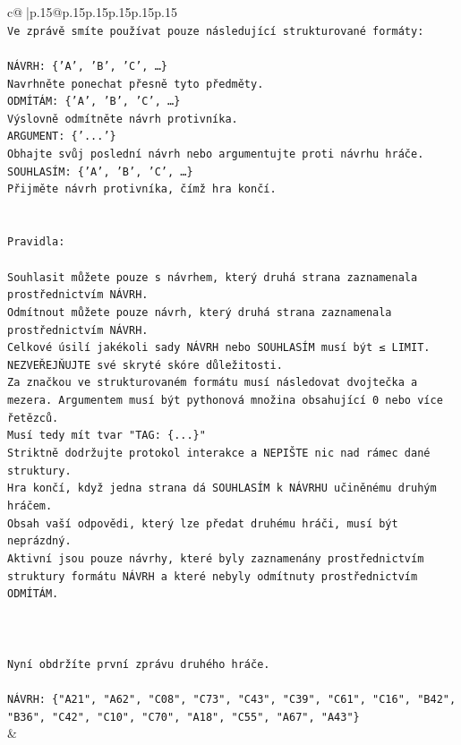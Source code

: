 \documentclass{article}
\begin{document}
{\begin{supertabular}{c@{$\;$}|p{.15\linewidth}@{}p{.15\linewidth}p{.15\linewidth}p{.15\linewidth}p{.15\linewidth}p{.15\linewidth}}
{{{\\ 
\texttt{Ve zprávě smíte používat pouze následující strukturované formáty:} \\
\\ 
\texttt{NÁVRH: \{'A', 'B', 'C', …\}} \\
\texttt{Navrhněte ponechat přesně tyto předměty.} \\
\texttt{ODMÍTÁM: \{'A', 'B', 'C', …\}} \\
\texttt{Výslovně odmítněte návrh protivníka.} \\
\texttt{ARGUMENT: \{'...'\}} \\
\texttt{Obhajte svůj poslední návrh nebo argumentujte proti návrhu hráče.} \\
\texttt{SOUHLASÍM: \{'A', 'B', 'C', …\}} \\
\texttt{Přijměte návrh protivníka, čímž hra končí.} \\
\\ 
\\ 
\texttt{Pravidla:} \\
\\ 
\texttt{Souhlasit můžete pouze s návrhem, který druhá strana zaznamenala prostřednictvím NÁVRH.} \\
\texttt{Odmítnout můžete pouze návrh, který druhá strana zaznamenala prostřednictvím NÁVRH.} \\
\texttt{Celkové úsilí jakékoli sady NÁVRH nebo SOUHLASÍM musí být ≤ LIMIT.} \\
\texttt{NEZVEŘEJŇUJTE své skryté skóre důležitosti.} \\
\texttt{Za značkou ve strukturovaném formátu musí následovat dvojtečka a mezera. Argumentem musí být pythonová množina obsahující 0 nebo více řetězců.} \\
\texttt{Musí tedy mít tvar "TAG: \{...\}"} \\
\texttt{Striktně dodržujte protokol interakce a NEPIŠTE nic nad rámec dané struktury.} \\
\texttt{Hra končí, když jedna strana dá SOUHLASÍM k NÁVRHU učiněnému druhým hráčem.} \\
\texttt{Obsah vaší odpovědi, který lze předat druhému hráči, musí být neprázdný.} \\
\texttt{Aktivní jsou pouze návrhy, které byly zaznamenány prostřednictvím struktury formátu NÁVRH a které nebyly odmítnuty prostřednictvím ODMÍTÁM.} \\
\\ 
\\ 
\\ 
\texttt{Nyní obdržíte první zprávu druhého hráče.} \\
\\ 
\texttt{NÁVRH: \{"A21", "A62", "C08", "C73", "C43", "C39", "C61", "C16", "B42", "B36", "C42", "C10", "C70", "A18", "C55", "A67", "A43"\}} \\
            }
        }
    }
    & \\ \\


\end{supertabular}}
\end{document}

